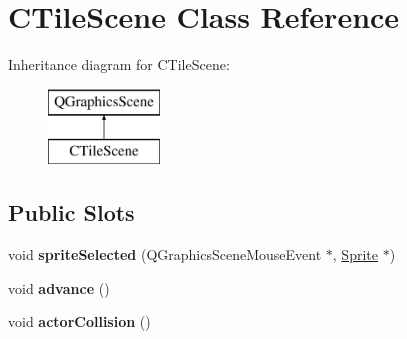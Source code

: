 \hypertarget{class_c_tile_scene}{}\section{C\+Tile\+Scene Class Reference}
\label{class_c_tile_scene}
Inheritance diagram for C\+Tile\+Scene\+:\begin{figure}[H]
\begin{center}
\leavevmode
\includegraphics[height=2.000000cm]{class_c_tile_scene}
\end{center}
\end{figure}
\subsection*{Public Slots}
\begin{DoxyCompactItemize}
\item 
\mbox{\label{class_c_tile_scene_a67ae697d823dfa1a23eb5a2541f2adc6}} 
void {\bfseries sprite\+Selected} (Q\+Graphics\+Scene\+Mouse\+Event $\ast$, \hyperlink{class_sprite}{Sprite} $\ast$)
\item 
\mbox{\label{class_c_tile_scene_a4b8b37c1cbd53a099b0a5dc42e3a5ff1}} 
void {\bfseries advance} ()
\item 
\mbox{\label{class_c_tile_scene_a5cf683b2bb5559b5d29d5c5d426faa69}} 
void {\bfseries actor\+Collision} ()
\end{DoxyCompactItemize}
